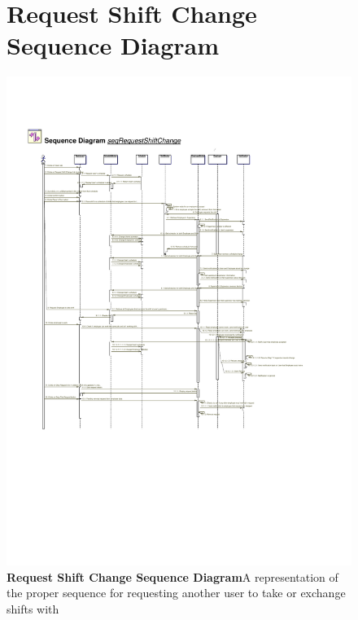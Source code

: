 \documentclass[letterpaper,12pt]{report}
\begin{document}
\begin{figure}[hbp]
 \section{Request Shift Change Sequence Diagram}
 \includegraphics[scale=0.65]{externals/SequenceDiagrams14.pdf}
 \caption{\small
\textbf{Request Shift Change Sequence Diagram}\newline A representation of the proper sequence for requesting another user to take or exchange shifts with}\label{fig:seqShiftChange}
\end{figure}
\newpage
\end{document}
